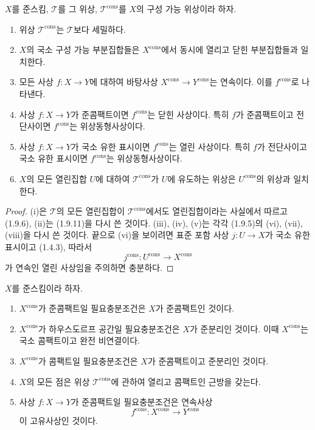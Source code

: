 \begin{proposition}[1.9.14]
\label{IV.1.9.14-fr}
$X$를 준스킴, $\mathscr T$를 그 위상,
$\mathscr T^{\mathrm{cons}}$를 $X$의 구성 가능 위상이라 하자.
\begin{enumerate}
  \item[(i)] 위상 $\mathscr T^{\mathrm{cons}}$는 $\mathscr T$보다
  세밀하다.
  \item[(ii)] $X$의 국소 구성 가능 부분집합들은
  $X^{\mathrm{cons}}$에서 동시에 열리고 닫힌 부분집합들과 일치한다.
  \item[(iii)] 모든 사상 $f:X\to Y$에 대하여 바탕사상
  $X^{\mathrm{cons}}\to Y^{\mathrm{cons}}$는 연속이다. 이를
  $f^{\mathrm{cons}}$로 나타낸다.
  \item[(iv)] 사상 $f:X\to Y$가 준콤팩트이면
  $f^{\mathrm{cons}}$는 닫힌 사상이다. 특히 $f$가 준콤팩트이고
  전단사이면 $f^{\mathrm{cons}}$는 위상동형사상이다.
  \item[(v)] 사상 $f:X\to Y$가 국소 유한 표시이면
  $f^{\mathrm{cons}}$는 열린 사상이다. 특히 $f$가 전단사이고 국소 유한
  표시이면 $f^{\mathrm{cons}}$는 위상동형사상이다.
  \item[(vi)] $X$의 모든 열린집합 $U$에 대하여
  $\mathscr T^{\mathrm{cons}}$가 $U$에 유도하는 위상은
  $U^{\mathrm{cons}}$의 위상과 일치한다.
\end{enumerate}
\end{proposition}

\begin{proof}
(i)은 $\mathscr T$의 모든 열린집합이 $\mathscr T^{\mathrm{cons}}$에서도
열린집합이라는 사실에서 따르고 (1.9.6), (ii)는 (1.9.11)을 다시 쓴
것이다. (iii), (iv), (v)는 각각 (1.9.5)의 (vi), (vii), (viii)을 다시
쓴 것이다. 끝으로 (vi)을 보이려면 표준 포함 사상 $j:U\to X$가 국소
유한 표시이고 (1.4.3), 따라서
\[
  j^{\mathrm{cons}}:U^{\mathrm{cons}}\longrightarrow X^{\mathrm{cons}}
\]
가 연속인 열린 사상임을 주의하면 충분하다.
\end{proof}

\begin{proposition}[1.9.15]
\label{IV.1.9.15-fr}
$X$를 준스킴이라 하자.
\begin{enumerate}
  \item[(i)] $X^{\mathrm{cons}}$가 준콤팩트일 필요충분조건은 $X$가
  준콤팩트인 것이다.
  \item[(ii)] $X^{\mathrm{cons}}$가 하우스도르프 공간일 필요충분조건은
  $X$가 준분리인 것이다. 이때 $X^{\mathrm{cons}}$는 국소 콤팩트이고
  완전 비연결이다.
  \item[(iii)] $X^{\mathrm{cons}}$가 콤팩트일 필요충분조건은 $X$가
  준콤팩트이고 준분리인 것이다.
  \item[(iv)] $X$의 모든 점은 위상 $\mathscr T^{\mathrm{cons}}$에
  관하여 열리고 콤팩트인 근방을 갖는다.
  \item[(v)] 사상 $f:X\to Y$가 준콤팩트일 필요충분조건은 연속사상
  \[
    f^{\mathrm{cons}}:X^{\mathrm{cons}}\longrightarrow Y^{\mathrm{cons}}
  \]
  이 고유사상인 것이다.
\end{enumerate}
\end{proposition}


